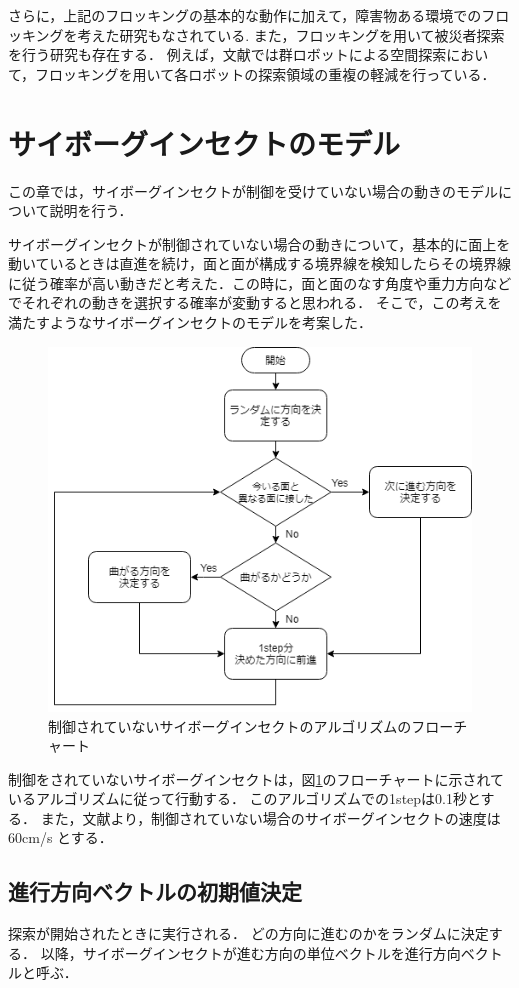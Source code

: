 \documentclass[a4paper,11pt]{jarticle}
\begin{document}
	さらに，上記のフロッキングの基本的な動作に加えて，障害物ある環境でのフロッキングを考えた研究もなされている\cite{obstacle}.
	また，フロッキングを用いて被災者探索を行う研究も存在する．
	例えば，文献\cite{exploration}では群ロボットによる空間探索において，フロッキングを用いて各ロボットの探索領域の重複の軽減を行っている．	
	\section{サイボーグインセクトのモデル}
	\label{sec:algorithm}
	この章では，サイボーグインセクトが制御を受けていない場合の動きのモデルについて説明を行う．
	
	サイボーグインセクトが制御されていない場合の動きについて，基本的に面上を動いているときは直進を続け，面と面が構成する境界線を検知したらその境界線に従う確率が高い動きだと考えた．この時に，面と面のなす角度や重力方向などでそれぞれの動きを選択する確率が変動すると思われる．
	そこで，この考えを満たすようなサイボーグインセクトのモデルを考案した．
	\begin{figure}
		\centering
		\includegraphics[width=0.7\linewidth]{png/Untitled.png}
		\caption[アルゴリズムのフローチャート]{制御されていないサイボーグインセクトのアルゴリズムのフローチャート}
		\label{fig:algorithm}
	\end{figure}
	
	制御をされていないサイボーグインセクトは，図\ref{fig:algorithm}のフローチャートに示されているアルゴリズムに従って行動する．
	このアルゴリズムでの1stepは0.1秒とする．
	また，文献より\cite{speed}，制御されていない場合のサイボーグインセクトの速度は 60cm/s とする．
	
	\subsection{進行方向ベクトルの初期値決定}
	\label{random}
	探索が開始されたときに実行される．
	どの方向に進むのかをランダムに決定する．
	以降，サイボーグインセクトが進む方向の単位ベクトルを進行方向ベクトルと呼ぶ．
		
\end{document}
